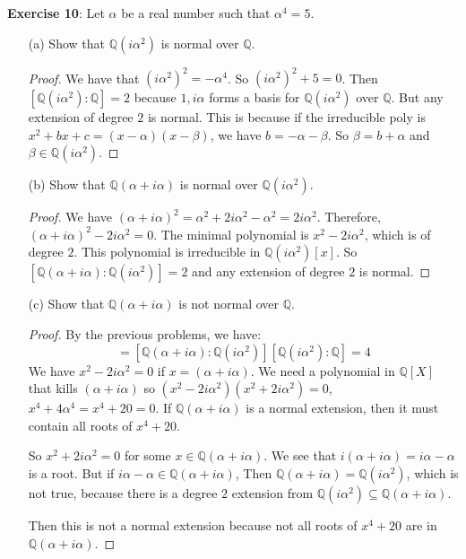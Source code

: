 \documentclass{article}
\begin{document}
\textbf{Exercise 10}: Let $\alpha$ be a real number such that $\alpha^{4} = 5$.
    \begin{itemize}
        \item [(a)] Show that $\mathbb{Q}(i\alpha^{2})$ is normal over $\mathbb{Q}$.
            \begin{proof}
                We have that $(i\alpha^{2})^{2} = -\alpha^{4}$. So $(i\alpha^{2})^{2} + 5 = 0$. Then $[\mathbb{Q}(i\alpha^{2}) : \mathbb{Q}] = 2$ because $1, i\alpha$ forms a basis for $\mathbb{Q}(i\alpha^{2})$ over $\mathbb{Q}$. But any extension of degree $2$ is normal. This is because if the irreducible poly is $x^{2} + bx + c = (x - \alpha) (x - \beta)$, we have  $b = -\alpha - \beta$. So $\beta = b + \alpha$ and $\beta \in \mathbb{Q}(i\alpha^{2})$.
            \end{proof}

        \item [(b)] Show that $\mathbb{Q}( \alpha + i\alpha)$ is normal over $\mathbb{Q}(i\alpha^{2})$.
            \begin{proof}
                We have $(\alpha + i\alpha)^{2} = \alpha^{2} + 2i\alpha^{2} - \alpha^{2} = 2i\alpha^{2}$. Therefore, $(\alpha + i\alpha)^{2} - 2i\alpha^{2} = 0$. The minimal polynomial is $x^{2} - 2i\alpha^{2}$, which is of degree $2$. This polynomial is irreducible in $\mathbb{Q}(i\alpha^{2})[x]$. So $[\mathbb{Q}(\alpha + i\alpha) : \mathbb{Q}(i\alpha^{2})]= 2$ and any extension of degree $2$ is normal.
            \end{proof}

        \item [(c)] Show that $\mathbb{Q}(\alpha + i\alpha)$ is not normal over $\mathbb{Q}$. 
            \begin{proof}
                By the previous problems, we have:
                    \begin{equation*}
                        [\mathbb{Q}(\alpha + i\alpha) : \mathbb{Q}] = [\mathbb{Q}(\alpha + i\alpha) : \mathbb{Q}(i\alpha^{2})][\mathbb{Q}(i\alpha^{2}) : \mathbb{Q}] = 4
                    \end{equation*}
                We have $x^{2} - 2i\alpha^{2} = 0$ if $x = (\alpha + i\alpha)$. We need a polynomial in $\mathbb{Q}[X]$ that kills $(\alpha + i\alpha)$ so $(x^{2} - 2i\alpha^{2}) (x^{2} + 2i\alpha^{2}) = 0$, $x^{4} + 4\alpha^{4} = x^{4} + 20 = 0$. If $\mathbb{Q}(\alpha + i\alpha)$ is a normal extension, then it must contain all roots of $x^{4} + 20$.

                So $x^{2} + 2i\alpha^{2} = 0$ for some $x \in \mathbb{Q}(\alpha + i\alpha)$. We see that $i(\alpha + i\alpha) = i\alpha - \alpha$ is a root. But if $i\alpha - \alpha \in \mathbb{Q}(\alpha + i\alpha)$, Then $\mathbb{Q}(\alpha + i\alpha) = \mathbb{Q}(i\alpha^{2})$, which is not true, because there is a degree $2$ extension from $\mathbb{Q}(i\alpha^{2})  \subseteq \mathbb{Q}(\alpha + i\alpha)$.

                Then this is not a normal extension because not all roots of $x^{4} + 20$ are in $\mathbb{Q}(\alpha + i\alpha)$.
            \end{proof}
    \end{itemize}
\end{document}

